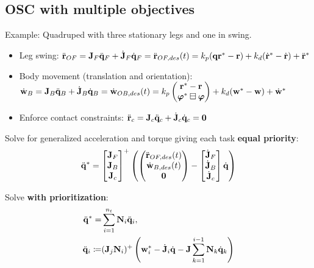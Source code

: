 \documentclass[a4paper, 8pt]{extarticle}
\begin{document}
\begin{multicols*}{3}
\subsection*{OSC with multiple objectives}
Example: Quadruped with three stationary legs and one in swing.
\begin{itemize}
\item Leg swing: $\ddot{\bf r}_{OF} = {\bf J}_F\ddot{\bf q}_F + \dot{\bf J}_F\dot{\bf q}_F = \ddot{\bf r}_{OF,des}(t) = k_p({\bf q
r}^* - {\bf r}) + k_d(\dot{\bf r}^* - \dot{\bf r}) + \ddot{\bf r}^*$
\item Body movement (translation and orientation): $\dot{\bf w}_B = {\bf J}_B\ddot{\bf q}_B + \dot{\bf J}_B\dot{\bf q}_B = \dot{\bf w}_{OB,des}(t) = k_p\begin{pmatrix}{\bf r}^* - {\bf r}\\ 
\bm \varphi^* \boxminus \bm \varphi
\end{pmatrix} + k_d({\bf w}^* - {\bf w}) + \dot{\bf w}^*$
\item Enforce contact constraints: $\ddot{\bf r}_c = {\bf J}_c\ddot{\bf q}_c + \dot{\bf J}_c\dot{\bf q}_c = {\bf 0}$
\end{itemize}
Solve for generalized acceleration and torque giving each task \textbf{equal priority}:
\begin{align*}
\ddot{\bf q}^* = \begin{bmatrix}
{\bf J}_F \\
{\bf J}_B \\
{\bf J}_c
\end{bmatrix}^+\left(
\begin{pmatrix}
\ddot{\bf r}_{OF,des}(t) \\
\dot{\bf w}_{B,des}(t)   \\
{\bf 0}
\end{pmatrix} - \begin{bmatrix}
\dot{\bf J}_F \\
\dot{\bf J}_B \\
\dot{\bf J}_c
\end{bmatrix} \dot{\bf q}
\right)
\end{align*}

Solve \textbf{with prioritization}:
\begin{align*}
\ddot{\bf q}^* =& \sum_{i=1}^{n_t}{\bf N}_i\ddot{\bf q}_i, \\
\ddot{\bf q}_i  \coloneqq&  ({\bf J}_j{\bf N}_i)^+ \left( {\bf w}_i^* - \dot{\bf J}_i\dot{\bf q} - {\bf J}\sum_{k = 1}^{i-1}{\bf N}_k\dot{\bf q}_k \right)
\end{align*}


\end{multicols*}
\end{document}

